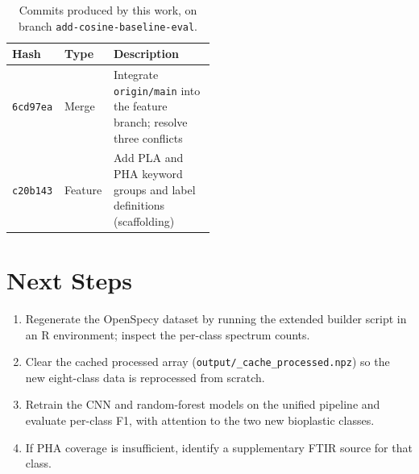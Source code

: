 \documentclass[11pt,a4paper]{article}
\begin{document}
\begin{table}[h]
\centering
\caption{Commits produced by this work, on branch
\texttt{add-cosine-baseline-eval}.}
\label{tab:commits}
\small
\begin{tabular}{@{}l l p{0.50\linewidth}@{}}
\toprule
\textbf{Hash} & \textbf{Type} & \textbf{Description} \\
\midrule
\texttt{6cd97ea} & Merge & Integrate \texttt{origin/main} into the feature branch;
resolve three conflicts \\
\texttt{c20b143} & Feature & Add PLA and PHA keyword groups and label definitions
(scaffolding) \\
\bottomrule
\end{tabular}
\end{table}

\section{Next Steps}

\begin{enumerate}
  \item Regenerate the OpenSpecy dataset by running the extended builder script
  in an R environment; inspect the per-class spectrum counts.
  \item Clear the cached processed array (\texttt{output/\_cache\_processed.npz})
  so the new eight-class data is reprocessed from scratch.
  \item Retrain the CNN and random-forest models on the unified pipeline and
  evaluate per-class F1, with attention to the two new bioplastic classes.
  \item If PHA coverage is insufficient, identify a supplementary FTIR source
  for that class.
\end{enumerate}
\end{document}
